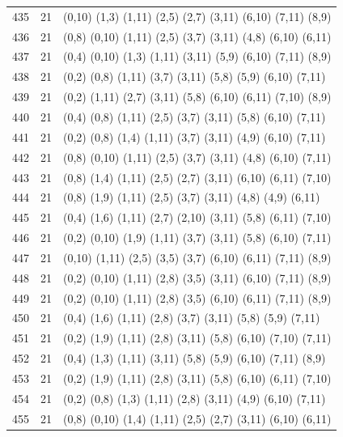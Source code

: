 \begin{appendix}
{\begin{longtable}{lll}
    435& 21 & (0,10)  (1,3)   (1,11)  (2,5)   (2,7)   (3,11)  (6,10)  (7,11)  (8,9)\\
    436& 21 & (0,8)   (0,10)  (1,11)  (2,5)   (3,7)   (3,11)  (4,8)   (6,10)  (6,11)\\
    437& 21 & (0,4)   (0,10)  (1,3)   (1,11)  (3,11)  (5,9)   (6,10)  (7,11)  (8,9)\\
    438& 21 & (0,2)   (0,8)   (1,11)  (3,7)   (3,11)  (5,8)   (5,9)   (6,10)  (7,11)\\
    439& 21 & (0,2)   (1,11)  (2,7)   (3,11)  (5,8)   (6,10)  (6,11)  (7,10)  (8,9)\\
    440& 21 & (0,4)   (0,8)   (1,11)  (2,5)   (3,7)   (3,11)  (5,8)   (6,10)  (7,11)\\
    441& 21 & (0,2)   (0,8)   (1,4)   (1,11)  (3,7)   (3,11)  (4,9)   (6,10)  (7,11)\\
    442& 21 & (0,8)   (0,10)  (1,11)  (2,5)   (3,7)   (3,11)  (4,8)   (6,10)  (7,11)\\
    443& 21 & (0,8)   (1,4)   (1,11)  (2,5)   (2,7)   (3,11)  (6,10)  (6,11)  (7,10)\\
    444& 21 & (0,8)   (1,9)   (1,11)  (2,5)   (3,7)   (3,11)  (4,8)   (4,9)   (6,11)\\
    445& 21 & (0,4)   (1,6)   (1,11)  (2,7)   (2,10)  (3,11)  (5,8)   (6,11)  (7,10)\\
    446& 21 & (0,2)   (0,10)  (1,9)   (1,11)  (3,7)   (3,11)  (5,8)   (6,10)  (7,11)\\
    447& 21 & (0,10)  (1,11)  (2,5)   (3,5)   (3,7)   (6,10)  (6,11)  (7,11)  (8,9)\\
    448& 21 & (0,2)   (0,10)  (1,11)  (2,8)   (3,5)   (3,11)  (6,10)  (7,11)  (8,9)\\
    449& 21 & (0,2)   (0,10)  (1,11)  (2,8)   (3,5)   (6,10)  (6,11)  (7,11)  (8,9)\\
    450& 21 & (0,4)   (1,6)   (1,11)  (2,8)   (3,7)   (3,11)  (5,8)   (5,9)   (7,11)\\
    451& 21 & (0,2)   (1,9)   (1,11)  (2,8)   (3,11)  (5,8)   (6,10)  (7,10)  (7,11)\\
    452& 21 & (0,4)   (1,3)   (1,11)  (3,11)  (5,8)   (5,9)   (6,10)  (7,11)  (8,9)\\
    453& 21 & (0,2)   (1,9)   (1,11)  (2,8)   (3,11)  (5,8)   (6,10)  (6,11)  (7,10)\\
    454& 21 & (0,2)   (0,8)   (1,3)   (1,11)  (2,8)   (3,11)  (4,9)   (6,10)  (7,11)\\
    455& 21 & (0,8)   (0,10)  (1,4)   (1,11)  (2,5)   (2,7)   (3,11)  (6,10)  (6,11)\\

\end{longtable}}
\end{appendix}
